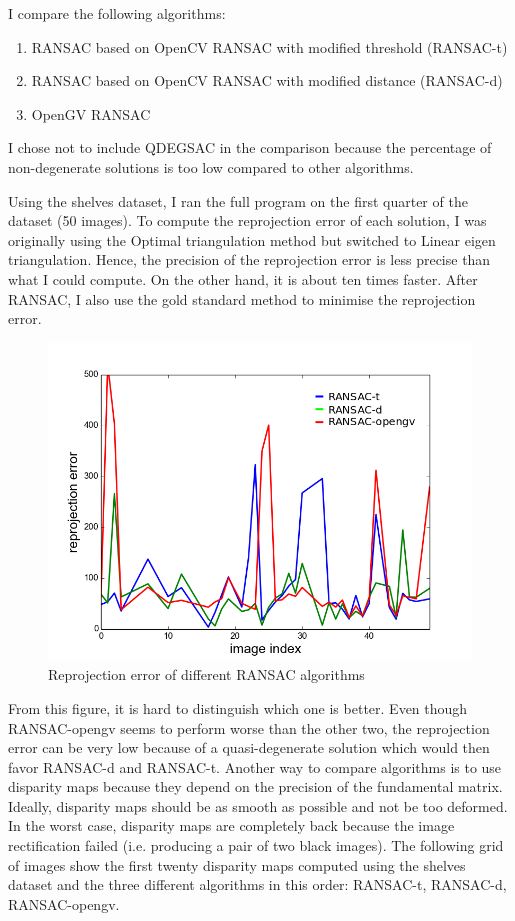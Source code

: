 \documentclass[11pt]{report}
\begin{document}
I compare the following algorithms:

\begin{enumerate}
  \item RANSAC based on OpenCV RANSAC with modified threshold (RANSAC-t)
  \item RANSAC based on OpenCV RANSAC with modified distance (RANSAC-d)
  \item OpenGV RANSAC
\end{enumerate}

I chose not to include QDEGSAC in the comparison because the percentage of non-degenerate solutions is too low compared to other algorithms. 

Using the shelves dataset, I ran the full program on the first quarter of the dataset (50 images). To compute the reprojection error of each solution, I was originally using the Optimal triangulation method but switched to Linear eigen triangulation. Hence, the precision of the reprojection error is less precise than what I could compute. On the other hand, it is about ten times faster. After RANSAC, I also use the gold standard method to minimise the reprojection error.

\begin{figure}[H]
  \includegraphics[scale=.4]{images/error-ransac.png}
  \caption{Reprojection error of different RANSAC algorithms}
\end{figure}

From this figure, it is hard to distinguish which one is better. Even though RANSAC-opengv seems to perform worse than the other two, the reprojection error can be very low because of a quasi-degenerate solution which would then favor RANSAC-d and RANSAC-t.
Another way to compare algorithms is to use disparity maps because they depend on the precision of the fundamental matrix.
Ideally, disparity maps should be as smooth as possible and not be too deformed. In the worst case, disparity maps are completely back because the image rectification failed (i.e. producing a pair of two black images). The following grid of images show the first twenty disparity maps computed using the shelves dataset and the three different algorithms in this order: RANSAC-t, RANSAC-d, RANSAC-opengv.
\end{document}
